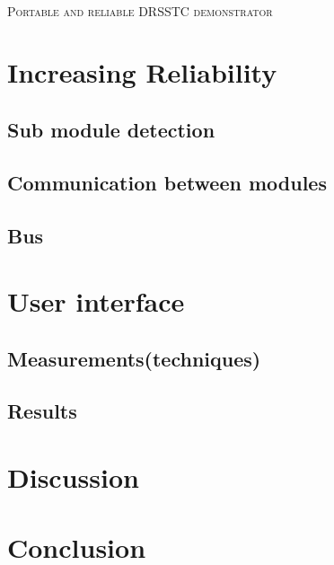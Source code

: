 \documentclass[12pt,English,a4paper,twoside,openright]{article}
\title{\MyTitle{}}
\author{\MyAuthor{}}
\newcommand{\MyTitle}{Portable and reliable DRSSTC demonstrator\\ }
\begin{document}


\newpage
\thispagestyle{empty}
\textsc{}\\
[4cm]
\begin{center}
\textsc{\Huge \MyTitle{}}
\end{center}
\restoregeometry %
\newpage

\pagestyle{fancy}
\setcounter{page}{1}
\label{abstract}

\newpage


\newpage

\tableofcontents
\listoffigures
\listoftables
\cleardoublepage %

\pagestyle{fancy}
\setcounter{page}{1}



\newpage





\section{Increasing Reliability}
\subsection{Sub module detection}
\subsection{Communication between modules}
\subsection{Bus}
\section{User interface}




\subsection{Measurements(techniques)}
\subsection{Results}
\section{Discussion}
\section{Conclusion}

\newpage


\end{document}
